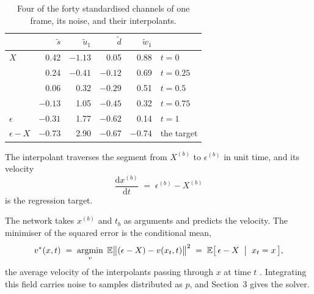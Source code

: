 \documentclass[10pt,a4paper]{article}
\begin{document}
\begin{table}[H]
\centering\small
\begin{tabular}{lrrrrl}
\toprule
 & $\tilde{s}$ & $\tilde{u}_1$ & $\tilde{d}$ & $\tilde{w}_1$ & \\
\midrule
$X$        &  0.42 & $-1.13$ &  0.05 &  0.88 & $t=0$ \\
           &  0.24 & $-0.41$ & $-0.12$ &  0.69 & $t=0.25$ \\
           &  0.06 &  0.32 & $-0.29$ &  0.51 & $t=0.5$ \\
           & $-0.13$ &  1.05 & $-0.45$ &  0.32 & $t=0.75$ \\
$\epsilon$ & $-0.31$ &  1.77 & $-0.62$ &  0.14 & $t=1$ \\
\midrule
$\epsilon-X$ & $-0.73$ & 2.90 & $-0.67$ & $-0.74$ & the target \\
\bottomrule
\end{tabular}
\caption{Four of the forty standardised channels of one frame, its noise, and
their interpolants.}
\label{tab:mixing}
\end{table}

The interpolant traverses the segment from $X^{(b)}$ to $\epsilon^{(b)}$ in unit
time, and its velocity
%
\begin{equation}
\frac{\mathrm{d}x^{(b)}}{\mathrm{d}t} \;=\; \epsilon^{(b)} - X^{(b)}
\label{eq:velocity}
\end{equation}
%
is the regression target.

The network takes $x^{(b)}$ and $t_b$ as arguments and predicts the velocity.
The minimiser of the squared error is the conditional mean,
%
\begin{equation}
v^{*}(x,t) \;=\;
\operatorname*{argmin}_{v}\;
\mathbb{E}\bigl\|(\epsilon-X) - v(x_t,t)\bigr\|^2
\;=\; \mathbb{E}\bigl[\,\epsilon-X \;\bigm|\; x_t = x\,\bigr],
\label{eq:expectation}
\end{equation}
%
the average velocity of the interpolants passing through $x$ at time $t$
\cite{rectified}. Integrating this field carries noise to samples distributed as
$p$, and Section~3 gives the solver.
\end{document}
